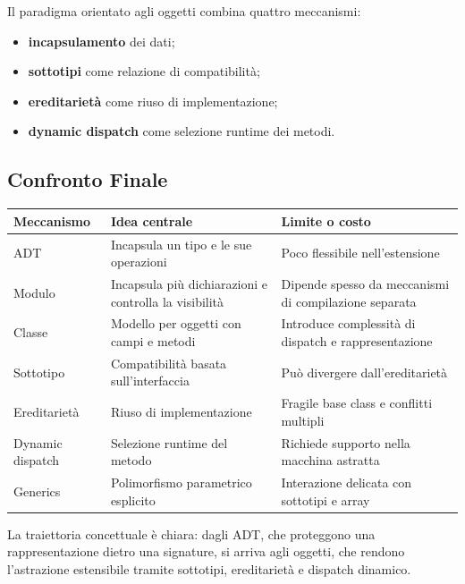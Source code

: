 \documentclass{article}
\begin{document}
Il paradigma orientato agli oggetti combina quattro meccanismi:
\begin{itemize}
  \item \textbf{incapsulamento} dei dati;
  \item \textbf{sottotipi} come relazione di compatibilità;
  \item \textbf{ereditarietà} come riuso di implementazione;
  \item \textbf{dynamic dispatch} come selezione runtime dei metodi.
\end{itemize}

\subsection{Confronto Finale}

\begin{center}
\begin{tabular}{|p{3.3cm}|p{5.2cm}|p{5.2cm}|}
\hline
\textbf{Meccanismo} & \textbf{Idea centrale} & \textbf{Limite o costo} \\
\hline
ADT & Incapsula un tipo e le sue operazioni & Poco flessibile nell'estensione \\
\hline
Modulo & Incapsula più dichiarazioni e controlla la visibilità & Dipende spesso da meccanismi di compilazione separata \\
\hline
Classe & Modello per oggetti con campi e metodi & Introduce complessità di dispatch e rappresentazione \\
\hline
Sottotipo & Compatibilità basata sull'interfaccia & Può divergere dall'ereditarietà \\
\hline
Ereditarietà & Riuso di implementazione & Fragile base class e conflitti multipli \\
\hline
Dynamic dispatch & Selezione runtime del metodo & Richiede supporto nella macchina astratta \\
\hline
Generics & Polimorfismo parametrico esplicito & Interazione delicata con sottotipi e array \\
\hline
\end{tabular}
\end{center}

La traiettoria concettuale è chiara: dagli ADT, che proteggono una rappresentazione dietro una signature, si arriva agli oggetti, che rendono l'astrazione estensibile tramite sottotipi, ereditarietà e dispatch dinamico.
\end{document}
